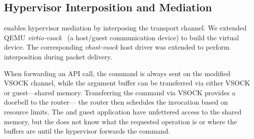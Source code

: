 

\subsection{Hypervisor Interposition and Mediation}
\label{s:impl_mediation}

\AvA enables hypervisor mediation by interposing the transport channel.
We extended QEMU \emph{virtio-vsock}~\cite{virtio,virtio_vsock} (a
host/guest communication device) to build the virtual device.
The corresponding \emph{vhost-vsock} host driver was extended to perform interposition during packet delivery.

When forwarding an API call, the command is always sent on the modified VSOCK channel, while the argument buffer can be transferred via either VSOCK or guest---\worker shared memory.
Transferring the command via VSOCK provides a doorbell to the router---%
the router then schedules the invocation based on resource limits.
The \worker and guest application have unfettered access to the shared memory, but the \worker does not know what the requested operation is or where the buffers are until the hypervisor forwards the command.

